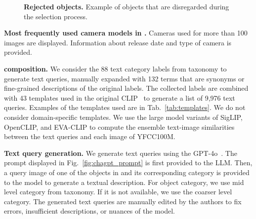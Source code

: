 \begin{figure}[t]
    \centering
    
    \vspace{-5pt}
    \caption{\textbf{Rejected objects.} Example of objects that are disregarded during the selection process.
    \label{fig:rejected}
    \vspace{5pt}
    }
\end{figure}

\begin{table}[t]
  \centering
  \scalebox{0.99}{
    
  }
  \vspace{-5pt}
  \caption{\textbf{Most frequently used camera models in \ours.} Cameras used for more than 100 images are displayed. Information about release date and type of camera is provided.
  \label{tab:cameras}
  \vspace{-5pt}
  }
\end{table}

\medskip\noindent\textbf{\miniours composition.} We consider the 88 text category labels from \ours taxonomy to generate text queries, manually expanded with 132 terms that are synonyms or fine-grained descriptions of the original labels. The collected labels are combined with 43 templates used in the original CLIP~\cite{clip} to generate a list of 9,976 text queries. Examples of the templates used are in Tab.~\ref{tab:templates}. We do not consider domain-specific templates. We use the large model variants of SigLIP, OpenCLIP, and EVA-CLIP to compute the ensemble text-image similarities between the text queries and each image of YFCC100M.

\medskip\noindent\textbf{Text query generation.} 
We generate text queries using the GPT-4o~\cite{chatgpt}. The prompt displayed in Fig.~\ref{fig:chagpt_prompt} is first provided to the LLM. 
Then, a query image of one of the objects in \ours and its corresponding category is provided to the model to generate a textual description. For object category, we use mid level category from taxonomy. If it is not available, we use the coarser level category. The generated text queries are manually edited by the authors to fix errors, insufficient descriptions, or nuances of the model.

